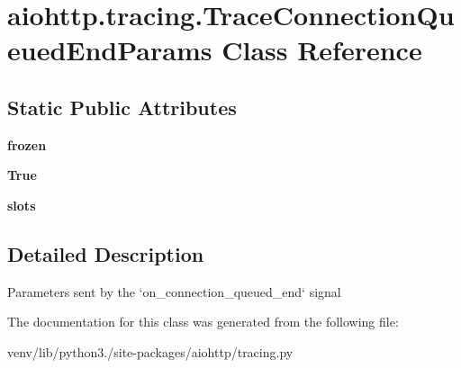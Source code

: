 \hypertarget{classaiohttp_1_1tracing_1_1_trace_connection_queued_end_params}{}\section{aiohttp.\+tracing.\+Trace\+Connection\+Queued\+End\+Params Class Reference}
\label{classaiohttp_1_1tracing_1_1_trace_connection_queued_end_params}
\subsection*{Static Public Attributes}
\begin{DoxyCompactItemize}
\item 
\mbox{\label{classaiohttp_1_1tracing_1_1_trace_connection_queued_end_params_a5e51a7d4c16e5a3cad43bf2d75df3639}} 
{\bfseries frozen}
\item 
\mbox{\label{classaiohttp_1_1tracing_1_1_trace_connection_queued_end_params_a3b3d355ad9071526d1ae3a48e02efc35}} 
{\bfseries True}
\item 
\mbox{\label{classaiohttp_1_1tracing_1_1_trace_connection_queued_end_params_a15555b3c61cb1487ea717612cb919522}} 
{\bfseries slots}
\end{DoxyCompactItemize}


\subsection{Detailed Description}
\begin{DoxyVerb}Parameters sent by the `on_connection_queued_end` signal\end{DoxyVerb}
 

The documentation for this class was generated from the following file\+:\begin{DoxyCompactItemize}
\item 
venv/lib/python3./site-\/packages/aiohttp/tracing.\+py\end{DoxyCompactItemize}
